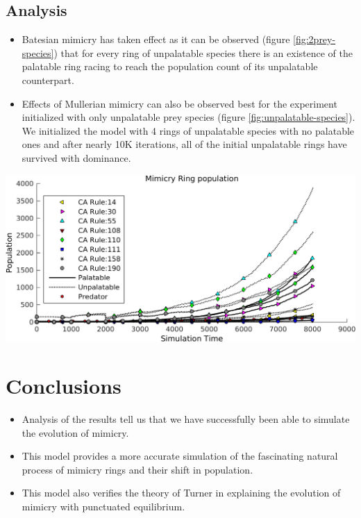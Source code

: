 \documentclass[a0,landscape]{a0poster}
\begin{document}
\begin{multicols}{5}
\color{SaddleBrown} 
\subsection*{Analysis}
\begin{itemize}
\item Batesian mimicry has taken effect as it can be observed (figure \ref{fig:2prey-species}) that for every ring of unpalatable species there is an existence of the palatable ring racing to reach the population count of its unpalatable counterpart.
\item Effects of Mullerian mimicry can also be observed best for the experiment initialized with only unpalatable prey species (figure \ref{fig:unpalatable-species}). We initialized the model with 4 rings of unpalatable species with no palatable ones and after nearly 10K iterations, all of the initial unpalatable rings have survived with dominance. 
\end{itemize}

\begin{center}\vspace{1cm}
\includegraphics[width=0.8\linewidth]{simTime8k-4Prey-unp.png}
\label{fig:unpalatable-species}
\end{center}\vspace{1cm}

\color{DarkSlateGray}
\section*{Conclusions}
\begin{itemize}
\item Analysis of the results tell us that we have successfully been able to simulate the evolution of mimicry.
\item This model provides a more accurate simulation of the fascinating natural process of mimicry rings and their shift in population. 
\item This model also verifies the theory of Turner in explaining the evolution of mimicry with punctuated equilibrium.
\end{itemize}


\end{multicols}
\end{document}

